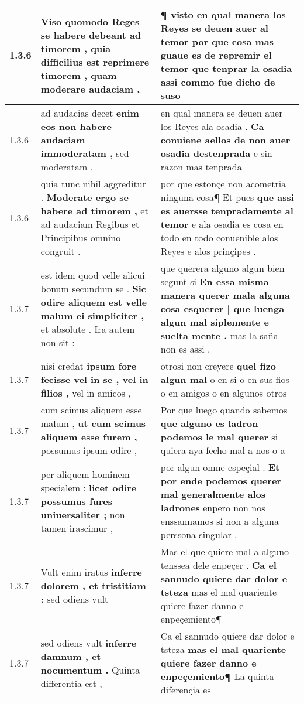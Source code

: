 \begin{tabular}{|p{1cm}|p{6.5cm}|p{6.5cm}|}
1.3.6 & Viso quomodo Reges se habere debeant ad timorem , \textbf{ quia difficilius est reprimere timorem , } quam moderare audaciam , & ¶ visto en qual manera los Reyes se deuen auer al temor \textbf{ por que cosa mas guaue es de repremir el temor que tenprar la osadia } assi commo fue dicho de suso \\\hline
1.3.6 & ad audacias decet \textbf{ enim eos non habere audaciam immoderatam , } sed moderatam . & en qual manera se deuen auer los Reyes ala osadia . \textbf{ Ca conuiene aellos de non auer osadia destenprada } e sin razon mas tenprada \\\hline
1.3.6 & quia tunc nihil aggreditur . \textbf{ Moderate ergo se habere ad timorem , } et ad audaciam Regibus et Principibus omnino congruit . & por que estonçe non acometria ninguna cosa¶ Et pues \textbf{ que assi es auersse tenpradamente al temor } e ala osadia es cosa en todo en todo conuenible alos Reyes e alos prinçipes . \\\hline
1.3.7 & est idem quod velle alicui bonum secundum se . \textbf{ Sic odire aliquem est velle malum ei simpliciter , } et absolute . Ira autem non sit : & que querera alguno algun bien segunt si \textbf{ En essa misma manera querer mala alguna cosa esquerer | que luenga algun mal siplemente e suelta mente . } mas la saña non es assi . \\\hline
1.3.7 & nisi credat \textbf{ ipsum fore fecisse vel in se , vel in filios , } vel in amicos , & otrosi non creyere \textbf{ quel fizo algun mal } o en si o en sus fios o en amigos o en algunos otros \\\hline
1.3.7 & cum scimus aliquem esse malum , \textbf{ ut cum scimus aliquem esse furem , } possumus ipsum odire , & Por que luego quando sabemos \textbf{ que alguno es ladron podemos le mal querer } si quiera aya fecho mal a nos o a \\\hline
1.3.7 & per aliquem hominem specialem : \textbf{ licet odire possumus fures uniuersaliter ; } non tamen irascimur , & por algun omne espeçial . \textbf{ Et por ende podemos querer mal generalmente alos ladrones } enpero non nos enssannamos si non a alguna perssona singular . \\\hline
1.3.7 & Vult enim iratus \textbf{ inferre dolorem , et tristitiam : } sed odiens vult & Mas el que quiere mal a alguno tenssea dele enpeçer . \textbf{ Ca el sannudo quiere dar dolor e tsteza } mas el mal quariente quiere fazer danno e enpeçemiento¶ \\\hline
1.3.7 & sed odiens vult \textbf{ inferre damnum , et nocumentum . } Quinta differentia est , & Ca el sannudo quiere dar dolor e tsteza \textbf{ mas el mal quariente quiere fazer danno e enpeçemiento¶ } La quinta diferençia es \\\hline

\end{tabular}
